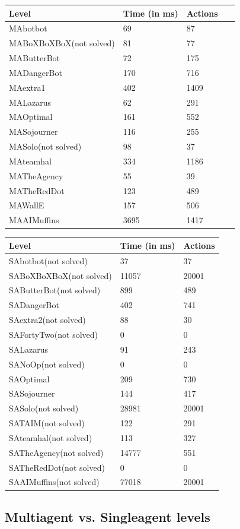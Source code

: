\begin{tabular}{ | l | l | l | l | }
\hline
	Level & Time (in ms) & Actions & \  \\ \hline
	MAbotbot & 69 & 87 & \  \\ \hline
	MABoXBoXBoX(not solved) & 81 & 77 & \  \\ \hline
	MAButterBot & 72 & 175 &   \\ \hline
	MADangerBot & 170 & 716 & \  \\ \hline
	MAextra1 & 402 & 1409 & \  \\ \hline
	MALazarus & 62 & 291 & \  \\ \hline
	MAOptimal & 161 & 552 & \  \\ \hline
	MASojourner & 116 & 255 & \  \\ \hline
	MASolo(not solved) & 98 & 37 & \  \\ \hline
	MAteamhal & 334 & 1186 & \  \\ \hline
	MATheAgency & 55 & 39 & \  \\ \hline
	MATheRedDot & 123 & 489 & \  \\ \hline
	MAWallE & 157 & 506 & \  \\ \hline
	MAAIMuffins & 3695 & 1417 & \  \\ \hline
\end{tabular}

\begin{tabular}{ | l | l | l | }
\hline
	Level & Time (in ms) & Actions \\ \hline
	SAbotbot(not solved) & 37 & 37 \\ \hline
	SABoXBoXBoX(not solved) & 11057 & 20001 \\ \hline
	SAButterBot(not solved) & 899 & 489 \\ \hline
	SADangerBot & 402 & 741 \\ \hline
	SAextra2(not solved) & 88 & 30 \\ \hline
	SAFortyTwo(not solved) & 0 & 0 \\ \hline
	SALazarus & 91 & 243 \\ \hline
	SANoOp(not solved) & 0 & 0 \\ \hline
	SAOptimal & 209 & 730 \\ \hline
	SASojourner & 144 & 417 \\ \hline
	SASolo(not solved) & 28981 & 20001 \\ \hline
	SATAIM(not solved) & 122 & 291 \\ \hline
	SAteamhal(not solved) & 113 & 327 \\ \hline
	SATheAgency(not solved) & 14777 & 551 \\ \hline
	SATheRedDot(not solved) & 0 & 0 \\ \hline
	SAAIMuffins(not solved) & 77018 & 20001 \\ \hline
\end{tabular}



\subsection{Multiagent vs. Singleagent levels}


